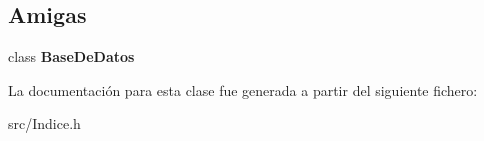 \subsection*{Amigas}
\begin{DoxyCompactItemize}
\item 
\hypertarget{classIndice_af1e840dbc460e53fa421d03b2da138e4}{class {\bfseries Base\+De\+Datos}}\label{classIndice_af1e840dbc460e53fa421d03b2da138e4}

\end{DoxyCompactItemize}


La documentación para esta clase fue generada a partir del siguiente fichero\+:\begin{DoxyCompactItemize}
\item 
src/Indice.\+h\end{DoxyCompactItemize}
